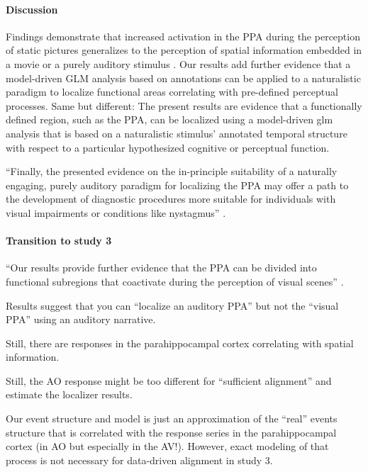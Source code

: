 \paragraph{Discussion}

Findings demonstrate that increased activation in the PPA during the perception
of static pictures generalizes to the perception of spatial information embedded
in a movie or a purely auditory stimulus \citep{haeusler2022processing}.
Our results add further evidence that a model-driven GLM analysis based on
annotations can be applied to a naturalistic paradigm to localize functional
areas correlating with pre-defined perceptual processes.
%
Same but different: The present results are evidence that a functionally defined
region, such as the PPA, can be localized using a model-driven \ac{glm} analysis
that is based on a naturalistic stimulus' annotated temporal structure with
respect to a particular hypothesized cognitive or perceptual function.

``Finally, the presented evidence on the in-principle suitability of a naturally
engaging, purely auditory paradigm for localizing the PPA may offer a path to
the development of diagnostic procedures more suitable for individuals with
visual impairments or conditions like nystagmus''
\citep{haeusler2022processing}.


\paragraph{Transition to study 3}



%
``Our results provide further evidence that the PPA can be divided into
functional subregions that coactivate during the perception of visual scenes''
\citep{haeusler2022processing}.

%
Results suggest that you can ``localize an auditory PPA'' but not the ``visual
PPA'' using an auditory narrative.

%
Still, there are responses in the parahippocampal cortex correlating with
spatial information.

%
Still, the AO response might be too different for ``sufficient alignment'' and
estimate the localizer results.

%
Our event structure and model is just an approximation of the ``real'' events
structure that is correlated with the response series in the parahippocampal
cortex (in AO but especially in the AV!).
%
However, exact modeling of that process is not necessary for data-driven
alignment in study 3.

